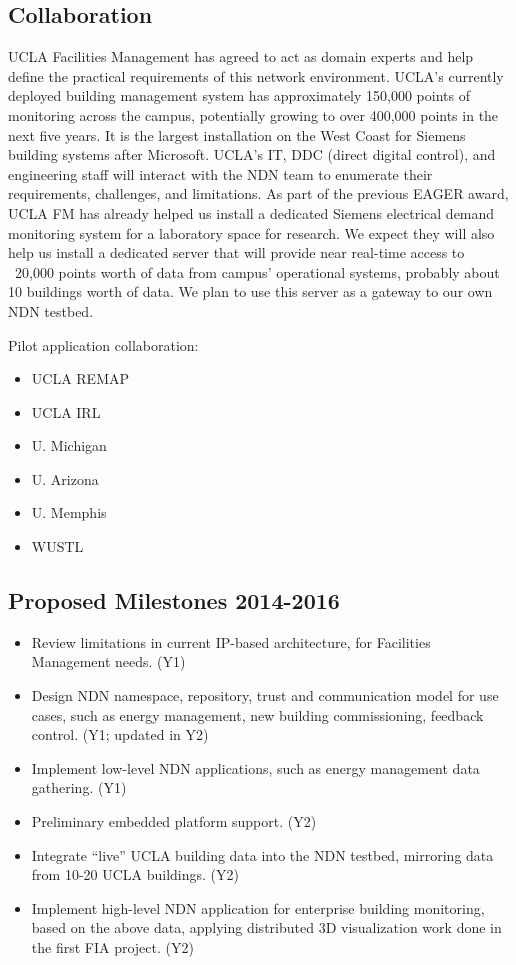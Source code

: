 \subsection{Collaboration}

UCLA Facilities Management has agreed to act as domain experts and help define the practical requirements of this network environment.  UCLA's currently deployed building management system has approximately 150,000 points of monitoring across the campus, potentially growing to over 400,000 points in the next five years.  It is the largest installation on the West Coast for Siemens building systems after Microsoft.  UCLA's IT, DDC (direct digital control), and engineering staff will interact with the NDN team to enumerate their requirements, challenges, and limitations.  As part of the previous EAGER award, UCLA FM has already helped us install a dedicated Siemens electrical demand monitoring system for a laboratory space for research.  We expect they will also help us install a dedicated server that will provide near real-time access to ~20,000 points worth of data from campus' operational systems, probably about 10 buildings worth of data.  We plan to use this server as a gateway to our own NDN testbed. 

Pilot application collaboration:
\begin{itemize}
\item UCLA REMAP
\item UCLA IRL
\item U. Michigan
\item U. Arizona
\item U. Memphis
\item WUSTL
\end{itemize}

\subsection{Proposed Milestones 2014-2016}

\begin{itemize}
\item Review limitations in current IP-based architecture, for Facilities Management needs. (Y1)
\item Design NDN namespace, repository, trust and communication model for use cases, such as energy management, new building commissioning, feedback control. (Y1; updated in Y2)
\item Implement low-level NDN applications, such as energy management data gathering. (Y1)
\item Preliminary embedded platform support. (Y2)
\item Integrate “live” UCLA building data into the NDN testbed, mirroring data from 10-20 UCLA buildings. (Y2)
\item Implement high-level NDN application for enterprise building monitoring, based on the above data, applying distributed 3D visualization work done in the first FIA project. (Y2)
\end{itemize}


